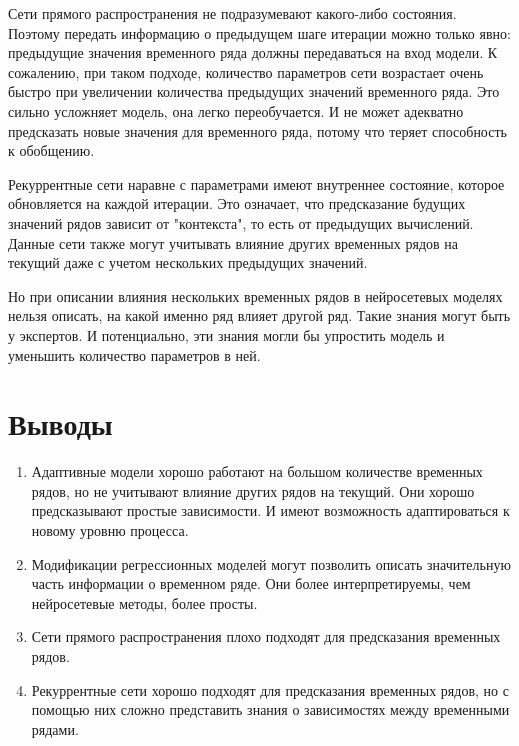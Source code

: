 Сети прямого распространения не подразумевают какого-либо состояния.
Поэтому передать информацию о предыдущем шаге итерации можно только явно:
предыдущие значения временного ряда должны передаваться на вход модели.
К сожалению, при таком подходе, количество параметров сети возрастает очень быстро
при увеличении количества предыдущих значений временного ряда. Это сильно усложняет модель,
она легко переобучается. И не может адекватно предсказать новые значения для временного ряда,
потому что теряет способность к обобщению.

Рекуррентные сети наравне с параметрами имеют внутреннее состояние, которое обновляется на каждой
итерации. Это означает, что предсказание будущих значений рядов зависит от "контекста",
то есть от предыдущих вычислений. Данные сети также могут учитывать влияние других
временных рядов на текущий даже с учетом нескольких предыдущих значений.

Но при описании влияния нескольких временных рядов в нейросетевых моделях
нельзя описать, на какой именно ряд влияет другой ряд. Такие знания могут быть у
экспертов. И потенциально, эти знания могли бы упростить модель и уменьшить количество
параметров в ней.



\section{Выводы}

\begin{enumerate}
	\item Адаптивные модели хорошо работают на большом количестве временных рядов,
	но не учитывают влияние других рядов на текущий. Они хорошо предсказывают простые зависимости.
	И имеют возможность адаптироваться к новому уровню процесса.
	\item Модификации регрессионных моделей могут позволить описать значительную
	часть информации о временном ряде. Они более интерпретируемы, чем нейросетевые методы, более просты.
	\item Сети прямого распространения плохо подходят для предсказания временных рядов.
	\item Рекуррентные сети хорошо подходят для предсказания временных рядов, но
	с помощью них сложно представить знания о зависимостях между временными рядами.
\end{enumerate}


